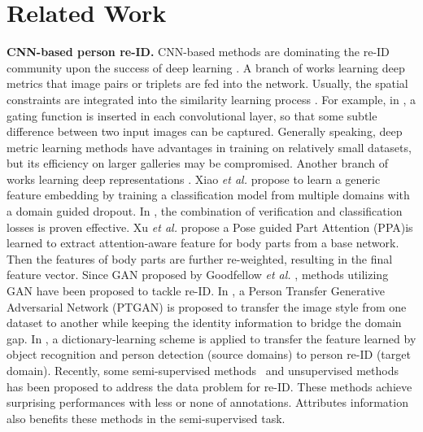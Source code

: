 \documentclass[5p,times,twocolumn]{elsarticle}
\begin{document}
\section{Related Work}
\textbf{CNN-based person re-ID.}
CNN-based methods are dominating the re-ID community upon the success of deep learning \cite{he2016deep,fan18unsupervisedreid,varior2016gated,zheng2017discriminatively,Xiao_2016_CVPR, zhou2018deep,zhu2017uncovering}.
A branch of works learning deep metrics \cite{ma2014person,li2014deepreid,ding2015deep} that image pairs or triplets are fed into the network. Usually, the spatial constraints are integrated into the similarity learning process \cite{li2014deepreid,ahmed2015improved}. For example, in \cite{varior2016gated}, a gating function is inserted in each convolutional layer, so that some subtle difference between two input images can be captured. 
Generally speaking, deep metric learning methods have advantages in training on relatively small datasets, but its efficiency on larger galleries may be compromised.
Another branch of works learning deep representations \cite{zheng2017discriminatively,Xiao_2016_CVPR, zhou2018deep, wu2018deep}.
Xiao \emph{et al.} \cite{Xiao_2016_CVPR} propose to learn a generic feature embedding by training a classification model from multiple domains with a domain guided dropout.  
In \cite{zheng2017discriminatively}, the combination of verification and classification losses is proven effective. 
Xu \emph{et al.} \cite{xu2018attention} propose a Pose guided Part Attention (PPA)is learned to extract attention-aware feature for body parts from a base network. Then the features of body parts are further re-weighted, resulting in the final feature vector.
Since GAN proposed by Goodfellow \emph{et al.} \cite{goodfellow2014generative}, methods utilizing GAN \cite{Wei_2018_CVPR,Zheng_2017_ICCV} have been proposed to tackle re-ID. In \cite{Wei_2018_CVPR}, a Person Transfer Generative Adversarial Network (PTGAN) is proposed to transfer the image style from one dataset to another while keeping the identity information to bridge the domain gap.   
In \cite{martinel2017person}, a dictionary-learning scheme is applied to transfer the feature learned by object recognition and person detection (source domains) to person re-ID (target domain).
Recently, some semi-supervised methods~\cite{wu2019progressive,wu2018cvpr_oneshot} and unsupervised methods~\cite{lin2019aBottom,fan18unsupervisedreid} has been proposed to address the data problem for re-ID. These methods achieve surprising performances with less or none of annotations. Attributes information also benefits these methods in the semi-supervised task.
    
\end{document}
